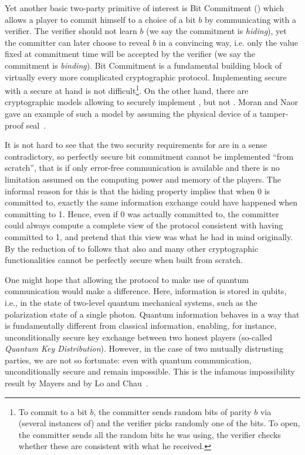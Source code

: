 Yet another basic two-party primitive of interest is  Bit Commitment (\BC) which allows a player to commit
himself to a choice of a bit $b$ by communicating with a verifier. The
verifier should not learn $b$ (we say the commitment is
\emph{hiding}), yet the committer can
later choose to reveal $b$ in a convincing way, i.e. only the value
fixed at commitment time will be accepted by the verifier (we say the
commitment is \emph{binding}).  Bit
Commitment is a fundamental building block of virtually every more
complicated cryptographic protocol. Implementing secure \BC with a
secure \OT at hand is not difficult\footnote{To commit to a bit $b$,
  the committer sends random bits of parity $b$ via (several instances
  of) \OT and the verifier picks randomly one of the bits. To open,
  the committer sends all the random bits he was using, the verifier
  checks whether these are consistent with what he received.}. On the
other hand, there are cryptographic models allowing to securely
implement \BC, but not \OT. Moran and Naor gave an example of such a
model by assuming the physical device of a tamper-proof seal~\cite{MN05}.

It is not hard to see that the two security requirements for \BC are
in a sense contradictory, so perfectly secure bit commitment cannot be
implemented ``from scratch'', that is if only error-free communication
is available and there is no limitation assumed on the computing power
and memory of the players. The informal reason for this is that the
hiding property implies that when 0 is committed to, exactly the same
information exchange could have happened when committing to 1.
Hence, even if 0 was actually committed to, the committer could always
compute a complete view of the protocol consistent with having
committed to 1, and pretend that this view was what he had in mind
originally. By the reduction of \BC to \OT follows that also \OT and
many other cryptographic functionalities cannot be perfectly secure
when built from scratch.

One might hope that allowing the protocol to make use of quantum
communication would make a difference. Here, information is stored in
qubits, i.e., in the state of two-level quantum mechanical systems,
such as the polarization state of a single photon. Quantum information
behaves in a way that is fundamentally different from classical
information, enabling, for instance, unconditionally secure key
exchange between two honest players (so-called
\emph{Quantum Key Distribution}).
However, in the case of two mutually distrusting parties, we are not
so fortunate: even with quantum communication, unconditionally secure
\BC and \OT remain impossible. This is the infamous
impossibility result by Mayers and by Lo and Chau~\cite{Mayers97,LC97}.

